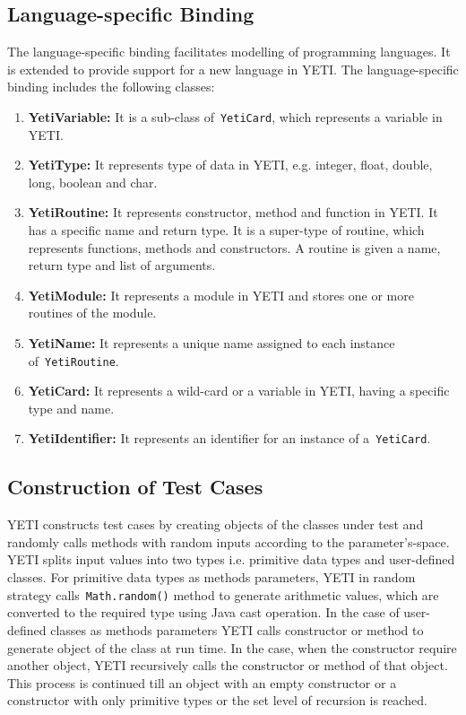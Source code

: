 \subsection{Language-specific Binding}
The language-specific binding facilitates modelling of programming languages. It is extended to provide support for a new language in YETI. The language-specific binding includes the following classes:
\begin{enumerate}
\item {\textbf{YetiVariable:}} It is a sub-class of~\verb+YetiCard+, which represents a variable in YETI.
\item {\textbf{YetiType:}} It represents type of data in YETI, e.g. integer, float, double, long, boolean and char.
\item {\textbf{YetiRoutine:}} It represents constructor, method and function in YETI. It has a specific name and return type. It is a super-type of routine, which represents functions, methods and constructors. A routine is given a name, return type and list of arguments.
\item {\textbf{YetiModule:}} It represents a module in YETI and stores one or more routines of the module.
\item {\textbf{YetiName:}} It represents a unique name assigned to each instance of~\verb+YetiRoutine+.
\item {\textbf{YetiCard:}} It represents a wild-card or a variable in YETI, having a specific type and name.
\item {\textbf{YetiIdentifier:}} It represents an identifier for an instance of a~\verb+YetiCard+.
\end{enumerate}

\subsection{Construction of Test Cases} \label{sec:constructionOfTestCases}
YETI constructs test cases by creating objects of the classes under test and randomly calls methods with random inputs according to the parameter's-space. YETI splits input values into two types i.e. primitive data types and user-defined classes. For primitive data types as methods parameters, YETI in random strategy calls~\verb+Math.random()+ method to generate arithmetic values, which are converted to the required type using Java cast operation. In the case of user-defined classes as methods parameters YETI calls constructor or method to generate object of the class at run time. In the case, when the constructor require another object, YETI recursively calls the constructor or method of that object. This process is continued till an object with an empty constructor or a constructor with only primitive types or the set level of recursion is reached.

